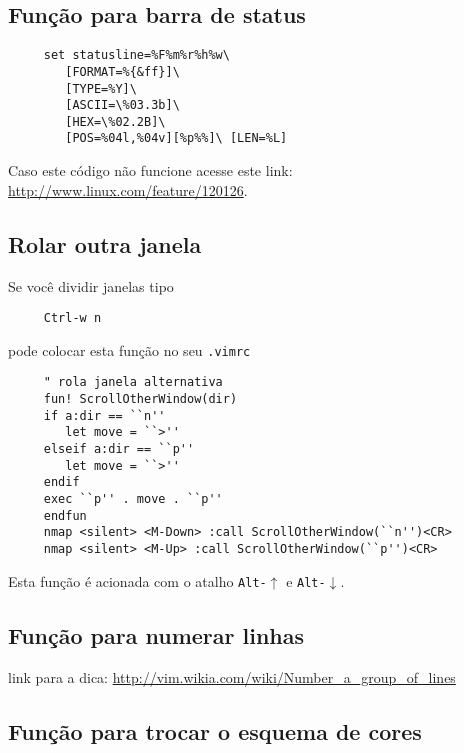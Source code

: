 \subsection{Função para barra de status}\label{Função para barra de status}

\begin{verbatim}
     set statusline=%F%m%r%h%w\
        [FORMAT=%{&ff}]\
        [TYPE=%Y]\
        [ASCII=\%03.3b]\
        [HEX=\%02.2B]\
        [POS=%04l,%04v][%p%%]\ [LEN=%L]
\end{verbatim}
Caso este código não funcione acesse este link: \url{http://www.linux.com/feature/120126}.


\subsection{Rolar outra janela}\label{Rolar outra janela}

Se você dividir janelas tipo

\begin{verbatim}
     Ctrl-w n
\end{verbatim}

pode colocar esta função no seu \verb|.vimrc|

\begin{verbatim}
     " rola janela alternativa
     fun! ScrollOtherWindow(dir)
     if a:dir == ``n''
        let move = ``>''
     elseif a:dir == ``p''
        let move = ``>''
     endif
     exec ``p'' . move . ``p''
     endfun
     nmap <silent> <M-Down> :call ScrollOtherWindow(``n'')<CR>
     nmap <silent> <M-Up> :call ScrollOtherWindow(``p'')<CR>
\end{verbatim}

Esta função é acionada com o atalho {\tt Alt-$\uparrow$} e {\tt Alt-$\downarrow$}.

\subsection{Função para numerar linhas}\label{Função para numerar linhas}
link para a dica: \url{http://vim.wikia.com/wiki/Number_a_group_of_lines}

\subsection{Função para trocar o esquema de cores}

